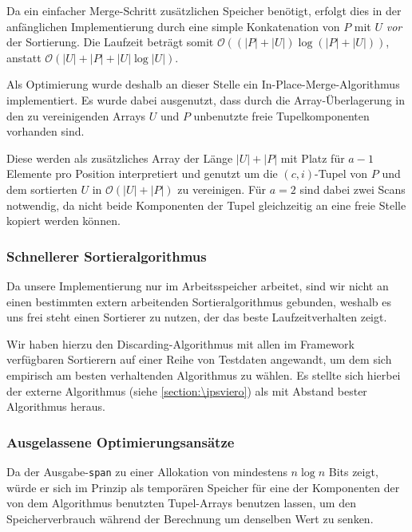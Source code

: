Da ein einfacher Merge-Schritt zusätzlichen Speicher benötigt, erfolgt dies in der anfänglichen Implementierung durch eine simple Konkatenation von $P$ mit $U$ \textit{vor} der Sortierung. Die Laufzeit beträgt somit $\mathcal{O}( (|P| + |U|) \log (|P| + |U|))$, anstatt $\mathcal{O}( |U| + |P| + |U| \log |U|)$.

Als Optimierung wurde deshalb an dieser Stelle ein In-Place-Merge-Algorithmus implementiert. Es wurde dabei ausgenutzt, dass durch die Array-Überlagerung in den zu vereinigenden Arrays $U$ und $P$ unbenutzte freie Tupelkomponenten vorhanden sind.

Diese werden als zusätzliches Array der Länge $|U| + |P|$ mit Platz für $a - 1$ Elemente pro Position interpretiert und genutzt um die $(c, i)$-Tupel von $P$ und dem sortierten $U$ in $\mathcal{O}( |U| + |P|)$ zu vereinigen. Für $a=2$ sind dabei zwei Scans notwendig, da nicht beide Komponenten der Tupel gleichzeitig an eine freie Stelle kopiert werden können.

\subsubsection{Schnellerer Sortieralgorithmus}

Da unsere Implementierung nur im Arbeitsspeicher arbeitet, sind wir nicht an einen bestimmten extern arbeitenden Sortieralgorithmus gebunden, weshalb es uns frei steht einen Sortierer zu nutzen, der das beste Laufzeitverhalten zeigt.

Wir haben hierzu den Discarding-Algorithmus mit allen im Framework verfügbaren Sortierern auf einer Reihe von Testdaten angewandt, um dem sich empirisch am besten verhaltenden Algorithmus zu wählen. Es stellte sich hierbei der externe \ipsviero Algorithmus (siehe \cref{section:\ipsviero}) als mit Abstand bester Algorithmus heraus.


\subsubsection{Ausgelassene Optimierungsansätze}

Da der Ausgabe-\texttt{span} zu einer Allokation von mindestens $n \log n$ Bits zeigt, würde er sich im Prinzip als temporären Speicher für eine der Komponenten der von dem Algorithmus benutzten Tupel-Arrays benutzen lassen, um den Speicherverbrauch während der Berechnung um denselben Wert zu senken. 


